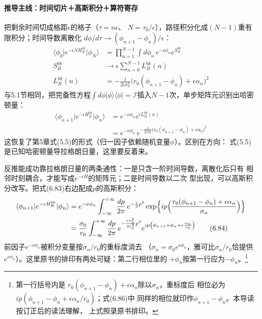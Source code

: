 \paragraph{推导主线：时间切片＋高斯积分＋算符寄存}
把剩余时间切成格距$\epsilon$的格子（$\tau=n\epsilon$、
$N=\tau_0/\epsilon$），路径积分化成$(N-1)$重有限积分；时间导数离散化
$d\phi/d\tau\to(\phi_{n+1}-\phi_n)/\epsilon$：
\begin{align*}
\langle\phi_0\vert e^{-\epsilon NH_B^{bk}}\vert\phi_N\rangle
&=\prod_{n=1}^{N-1}\int d\phi_n\,e^{-\nu\phi_n}e^{S_B^{bk}}\\
S_B^{bk}&\to\epsilon\sum_{n=0}^{N-1}L_B^{bk}(n)\\
L_B^{bk}(n)&=-\frac{1}{2\epsilon\sigma_n^2}
\bigl(r_0(\phi_{n+1}-\phi_n)+\epsilon\alpha_n\bigr)^2
\tag{6.82}
\end{align*}
与5.1节相同，把完备性方程$\int d\phi\vert\phi\rangle\langle\phi
\vert=\mathcal{I}$插入$N-1$次，单步矩阵元识别出哈密顿量：
\begin{align*}
\langle\phi_{n+1}\vert e^{-\epsilon H_B^{bk}}\vert\phi_n\rangle
&=e^{-\nu\phi_n}e^{\epsilon L_B^{bk}(n)}\\
&=e^{-\nu\phi_n}\,e^{-\frac{1}{2\epsilon\sigma_n^2}
\bigl(r_0(\phi_{n+1}-\phi_n)+\epsilon\alpha_n\bigr)^2}
\tag{6.83}
\end{align*}
这恢复了第5章式(5.5)的形式（归一因子依赖随机变量$\phi$）。区别在方向：
式(5.5)是已知哈密顿量导拉格朗日量，这里要反着来。

反推能成功靠拉格朗日量的两条通性：一是只含一阶时间导数，离散化后只有
相邻时刻耦合，才能写成$e^{-\epsilon H}$的矩阵元；二是时间导数以二次
型出现，可以高斯积分改写。把式(6.83)右边配成$p$的高斯积分：
\begin{align*}
\langle\phi_{n+1}\vert e^{-\epsilon H_B^{bk}}\vert\phi_n\rangle
&=e^{-\nu\phi_n}\int_{-\infty}^{+\infty}\frac{dp}{2\pi}\,
e^{-\frac{\epsilon}{2}p^2}
\exp\Bigl\{ip\Bigl(\frac{r_0(\phi_{n+1}-\phi_n)+\epsilon\alpha_n}
{\sigma_n}\Bigr)\Bigr\}\\
&=\frac{\sigma_0}{r_0}\int_{-\infty}^{+\infty}\frac{dp}{2\pi}\,
e^{-\frac{\epsilon\sigma_n^2}{2r_0^2}p^2}
e^{ip\left(\phi_{n+1}+\phi_n+\epsilon\frac{\alpha_n}{r_0}\right)}
\tag{6.84}
\end{align*}
前因子$e^{-\nu\phi_n}$被积分变量按$\sigma_n/r_0$的重标度消去
（$\sigma_n=\sigma_0e^{\nu\phi_n}$，雅可比$\sigma_n/r_0$恰提供
$e^{\nu\phi_n}$）。这里原书的排印有两处可疑：第二行相位里的
$+\phi_n$按第一行应为$-\phi_n$。\footnote{第一行括号内是
$r_0(\phi_{n+1}-\phi_n)+\epsilon\alpha_n$除以$\sigma_n$，重标度后
相位必为$ip(\phi_{n+1}-\phi_n+\epsilon\alpha_n/r_0)$；式(6.86)中
同样的相位就印作$\phi_{n+1}-\phi_n$。本导读按订正后的读法理解，
上式照录原书排印。}

